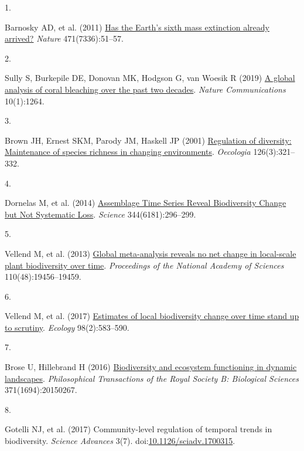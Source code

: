 \documentclass{article}
\newlength{\cslhangindent}
\newlength{\csllabelwidth}
\newlength{\cslentryspacingunit} %
\newenvironment{CSLReferences}[2] %
 {%
  \setlength{\parindent}{0pt}
  \ifodd #1
  \let\oldpar\par
  \def\par{\hangindent=\cslhangindent\oldpar}
  \fi
  \setlength{\parskip}{#2\cslentryspacingunit}
 }%
 {}
\newcommand{\CSLLeftMargin}[1]{\parbox[t]{\csllabelwidth}{#1}}
\newcommand{\CSLRightInline}[1]{\parbox[t]{\linewidth - \csllabelwidth}{#1}\break}
\begin{document}
\hypertarget{refs}{}
\begin{CSLReferences}{0}{0}
\leavevmode{}%
\CSLLeftMargin{1. }%
\CSLRightInline{Barnosky AD, et al. (2011)
\href{https://doi.org/10.1038/nature09678}{Has the Earth{'}s sixth mass
extinction already arrived?} \emph{Nature} 471(7336):51--57.}

\leavevmode{}%
\CSLLeftMargin{2. }%
\CSLRightInline{Sully S, Burkepile DE, Donovan MK, Hodgson G, van Woesik
R (2019) \href{https://doi.org/10.1038/s41467-019-09238-2}{A global
analysis of coral bleaching over the past two decades}. \emph{Nature
Communications} 10(1):1264.}

\leavevmode{}%
\CSLLeftMargin{3. }%
\CSLRightInline{Brown JH, Ernest SKM, Parody JM, Haskell JP (2001)
\href{http://www.jstor.org/stable/4222853}{Regulation of diversity:
Maintenance of species richness in changing environments}.
\emph{Oecologia} 126(3):321--332.}

\leavevmode{}%
\CSLLeftMargin{4. }%
\CSLRightInline{Dornelas M, et al. (2014)
\href{https://doi.org/10.1126/science.1248484}{Assemblage Time Series
Reveal Biodiversity Change but Not Systematic Loss}. \emph{Science}
344(6181):296--299.}

\leavevmode{}%
\CSLLeftMargin{5. }%
\CSLRightInline{Vellend M, et al. (2013)
\href{https://doi.org/10.1073/pnas.1312779110}{Global meta-analysis
reveals no net change in local-scale plant biodiversity over time}.
\emph{Proceedings of the National Academy of Sciences}
110(48):19456--19459.}

\leavevmode{}%
\CSLLeftMargin{6. }%
\CSLRightInline{Vellend M, et al. (2017)
\href{https://doi.org/10.1002/ecy.1660}{Estimates of local biodiversity
change over time stand up to scrutiny}. \emph{Ecology} 98(2):583--590.}

\leavevmode{}%
\CSLLeftMargin{7. }%
\CSLRightInline{Brose U, Hillebrand H (2016)
\href{https://doi.org/10.1098/rstb.2015.0267}{Biodiversity and ecosystem
functioning in dynamic landscapes}. \emph{Philosophical Transactions of
the Royal Society B: Biological Sciences} 371(1694):20150267.}

\leavevmode{}%
\CSLLeftMargin{8. }%
\CSLRightInline{Gotelli NJ, et al. (2017) Community-level regulation of
temporal trends in biodiversity. \emph{Science Advances} 3(7).
doi:\href{https://doi.org/10.1126/sciadv.1700315}{10.1126/sciadv.1700315}.}


\end{CSLReferences}
\end{document}
